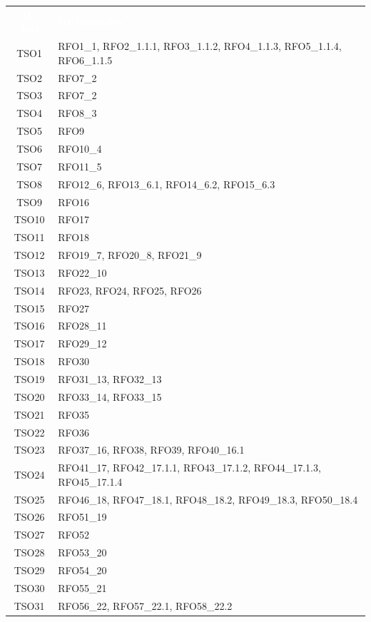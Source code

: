 \begin{longtable}{|c| C{13cm}|}
	\textcolor{white}{\textbf{ID Test}}&
	\textcolor{white}{\textbf{ID Requisito}}\label{tab:TestSistema2}\\
	TSO1 & RFO1\_1, RFO2\_1.1.1, RFO3\_1.1.2, RFO4\_1.1.3, RFO5\_1.1.4, RFO6\_1.1.5\\ \hline
	TSO2 & RFO7\_2\\ \hline
	TSO3 & RFO7\_2\\ \hline
	TSO4 & RFO8\_3\\ \hline
	TSO5 & RFO9\\ \hline
	TSO6 & RFO10\_4\\ \hline
	TSO7 & RFO11\_5\\ \hline
	TSO8 & RFO12\_6, RFO13\_6.1, RFO14\_6.2, RFO15\_6.3\\ \hline
	TSO9 & RFO16\\ \hline
	TSO10 & RFO17\\ \hline
	TSO11 & RFO18\\ \hline
	TSO12 & RFO19\_7, RFO20\_8, RFO21\_9\\ \hline
	TSO13 & RFO22\_10\\ \hline
	TSO14 & RFO23, RFO24, RFO25, RFO26\\ \hline
	TSO15 & RFO27\\ \hline
	TSO16 & RFO28\_11\\ \hline
	TSO17 & RFO29\_12\\ \hline
	TSO18 & RFO30\\ \hline
	TSO19 & RFO31\_13, RFO32\_13\\ \hline
	TSO20 & RFO33\_14, RFO33\_15\\ \hline
	TSO21 & RFO35\\ \hline
	TSO22 & RFO36\\ \hline
	TSO23 & RFO37\_16, RFO38, RFO39, RFO40\_16.1\\ \hline
	TSO24 & RFO41\_17, RFO42\_17.1.1, RFO43\_17.1.2, RFO44\_17.1.3, RFO45\_17.1.4\\ \hline
	TSO25 & RFO46\_18, RFO47\_18.1, RFO48\_18.2, RFO49\_18.3, RFO50\_18.4\\ \hline
	TSO26 & RFO51\_19\\ \hline
	TSO27 & RFO52\\ \hline
	TSO28 & RFO53\_20\\ \hline
	TSO29 & RFO54\_20\\ \hline
	TSO30 & RFO55\_21\\ \hline
	TSO31 & RFO56\_22, RFO57\_22.1, RFO58\_22.2\\ \hline

\end{longtable}
